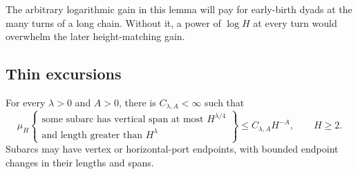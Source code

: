 The arbitrary logarithmic gain in this lemma will pay for early-birth
dyads at the many turns of a long chain. Without it, a power of
$\log H$ at every turn would overwhelm the later height-matching gain.

\subsection{Thin excursions}

\begin{lemma}\label{lem:11-thin-excursions}
For every $\lambda>0$ and $A>0$, there is $C_{\lambda,A}<\infty$ such that
\[
 \mu_H\!\left\{\begin{array}{l}
 \text{some subarc has vertical span at most }H^{\lambda/4}\\
 \text{and length greater than }H^\lambda
 \end{array}\right\}
 \le C_{\lambda,A}H^{-A},\qquad H\ge2.
\]
Subarcs may have vertex or horizontal-port endpoints, with bounded
endpoint changes in their lengths and spans.
\end{lemma}

